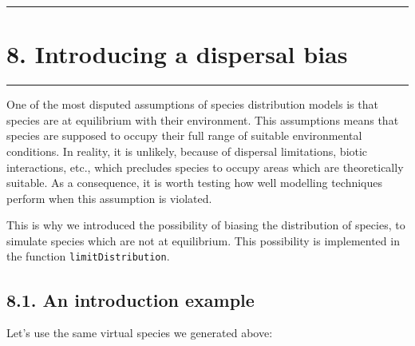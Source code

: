 \documentclass[]{article}
\begin{document}
\begin{center}\rule{0.5\linewidth}{\linethickness}\end{center}

\section{8. Introducing a dispersal
bias}\label{introducing-a-dispersal-bias}

\begin{center}\rule{0.5\linewidth}{\linethickness}\end{center}

\setcounter{section}{8} \setcounter{figure}{0}

One of the most disputed assumptions of species distribution models is
that species are at equilibrium with their environment. This assumptions
means that species are supposed to occupy their full range of suitable
environmental conditions. In reality, it is unlikely, because of
dispersal limitations, biotic interactions, etc., which precludes
species to occupy areas which are theoretically suitable. As a
consequence, it is worth testing how well modelling techniques perform
when this assumption is violated.

This is why we introduced the possibility of biasing the distribution of
species, to simulate species which are not at equilibrium. This
possibility is implemented in the function \texttt{limitDistribution}.

\subsection{8.1. An introduction
example}\label{an-introduction-example-2}

Let's use the same virtual species we generated above:
\end{document}
